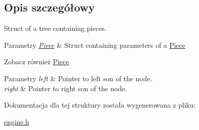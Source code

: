 \subsection{Opis szczegółowy}
Struct of a tree containing pieces. 


\begin{DoxyParams}{Parametry}
{\em \hyperlink{structPiece}{Piece}} & Struct containing parameters of a \hyperlink{structPiece}{Piece} \\
\hline
\end{DoxyParams}
\begin{DoxySeeAlso}{Zobacz również}
\hyperlink{structPiece}{Piece} 
\end{DoxySeeAlso}

\begin{DoxyParams}{Parametry}
{\em left} & Pointer to left son of the node. \\
\hline
{\em right} & Pointer to right son of the node. \\
\hline
\end{DoxyParams}


Dokumentacja dla tej struktury została wygenerowana z pliku\-:\begin{DoxyCompactItemize}
\item 
\hyperlink{engine_8h}{engine.\-h}\end{DoxyCompactItemize}
